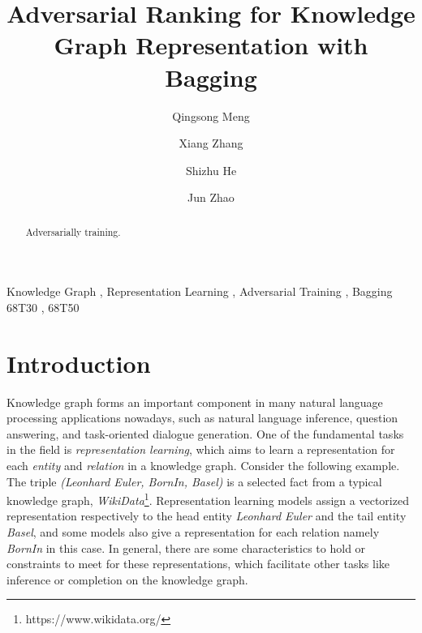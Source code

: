 \documentclass[twocolumn,a4paper,10pt,review,3p]{elsarticle}
\begin{document}

\begin{frontmatter}

\title{Adversarial Ranking for Knowledge Graph Representation with Bagging}


\author[hrbaddress]{Qingsong Meng}

\author[ucasaddress,hrbaddress]{Xiang Zhang}

\author[ucasaddress]{Shizhu He}

\author[ucasaddress]{Jun Zhao}

\address[hrbaddress]{Harbin University of Science and Technology, No.52 Xuefu Road, Nangang District, Harbin, 150080, China}
\address[ucasaddress]{University of Chinese Academy of Sciences, No.19(A) Yuquan Road, Shijingshan District, Beijing, P.R.China 100049}


\begin{abstract}
Adversarially training.
\end{abstract}

\begin{keyword}
Knowledge Graph \sep{} Representation Learning \sep{} Adversarial Training \sep{} Bagging
\MSC[2010] 68T30 \sep{} 68T50
\end{keyword}

\end{frontmatter}


\linenumbers{}


\section{Introduction}

Knowledge graph forms an important component in many natural language processing applications nowadays, such as natural language inference, question answering, and task-oriented dialogue generation. One of the fundamental tasks in the field is \emph{representation learning}, which aims to learn a representation for each \emph{entity} and \emph{relation} in a knowledge graph. Consider the following example. The triple \emph{(Leonhard Euler, BornIn, Basel)} is a selected fact from a typical knowledge graph, \emph{WikiData}\footnote{https://www.wikidata.org/}. Representation learning models assign a vectorized representation respectively to the head entity \emph{Leonhard Euler} and the tail entity \emph{Basel}, and some models also give a representation for each relation namely \emph{BornIn} in this case. In general, there are some characteristics to hold or constraints to meet for these representations, which facilitate other tasks like inference or completion on the knowledge graph.
\end{document}
